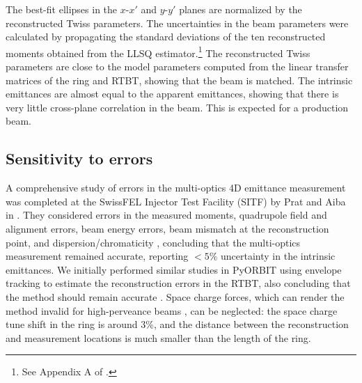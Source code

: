 %
The best-fit ellipses in the $x$-$x'$ and $y$-$y'$ planes are normalized by the reconstructed Twiss parameters. The uncertainties in the beam parameters were calculated by propagating the standard deviations of the ten reconstructed moments obtained from the LLSQ estimator.\footnote{See Appendix A of \cite{Faus-Golfe2016}.} The reconstructed Twiss parameters are close to the model parameters computed from the linear transfer matrices of the ring and RTBT, showing that the beam is matched. The intrinsic emittances are almost equal to the apparent emittances, showing that there is very little cross-plane correlation in the beam. This is expected for a production beam.



\subsection{Sensitivity to errors}

A comprehensive study of errors in the multi-optics 4D emittance measurement was completed at the SwissFEL Injector Test Facility (SITF) by Prat and Aiba in \cite{Prat2014}. They considered errors in the measured moments, quadrupole field and alignment errors, beam energy errors, beam mismatch at the reconstruction point, and dispersion/chromaticity \cite{Mostacci2012}, concluding that the multi-optics measurement remained accurate, reporting $< 5\%$ uncertainty in the intrinsic emittances. We initially performed similar studies in PyORBIT using envelope tracking to estimate the reconstruction errors in the RTBT, also concluding that the method should remain accurate \cite{Hoover2021-IPAC}. Space charge forces, which can render the method invalid for high-perveance beams \cite{Anderson2002}, can be neglected: the space charge tune shift in the ring is around 3\%, and the distance between the reconstruction and measurement locations is much smaller than the length of the ring. 

